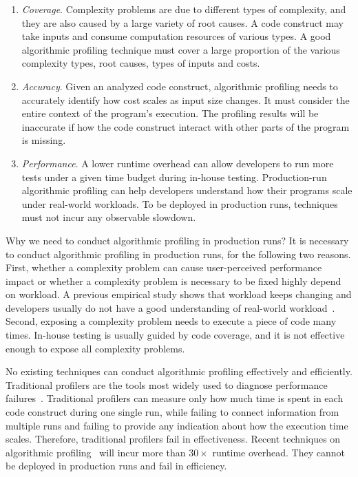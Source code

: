 \begin{enumerate}

\item \textit{Coverage}. Complexity problems are due to different types of complexity,
and they are also caused by a large variety of root causes.
A code construct may take inputs and
consume computation resources of various types.
A good algorithmic profiling technique must cover a
large proportion of the various complexity types, root causes, types of inputs and costs.


\item \textit{Accuracy}.
Given an analyzed code construct,
algorithmic profiling needs to accurately identify
how cost scales as input size changes.
It must consider the entire context of the program's execution.
The profiling results will be inaccurate if how the code construct interact with other parts of the program is missing.

\item \textit{Performance}.
A lower runtime overhead can allow developers to run more tests
under a given time budget during in-house testing.
Production-run algorithmic profiling can help developers
understand how their programs scale
under real-world workloads.
To be deployed in production runs,
techniques must not incur any observable slowdown.


\end{enumerate}

\fi

{\color{red} Why we need to conduct algorithmic profiling in production runs?}
It is necessary to conduct algorithmic profiling in production runs, 
for the following two reasons. 
First, whether a complexity problem can 
cause user-perceived performance 
impact or whether a complexity problem is necessary to be fixed 
highly depend on workload. 
A previous empirical study shows that workload keeps changing and 
developers usually do not have a good understanding of 
real-world workload~\citep{PerfBug}. 
Second, exposing a complexity problem needs to 
execute a piece of code many times. 
In-house testing is usually guided by code coverage, 
and it is not effective enough to expose all complexity problems. 


No existing techniques can conduct algorithmic profiling effectively and efficiently. 
Traditional profilers are the tools most widely used to
diagnose performance failures~\cite{gprof,oprofile}.
Traditional profilers can measure only how much time 
is spent in each code construct during one single run,
while failing to connect information from multiple runs
and failing to provide any indication about how the execution time scales.
Therefore, traditional profilers fail in effectiveness.
Recent techniques on algorithmic 
profiling~\cite{Aprof1,Aprof2,AlgoProf} will incur more than $30\times$ runtime overhead.
They cannot be deployed in production runs and fail in efficiency. 



